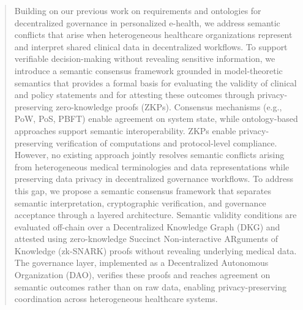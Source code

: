 \documentclass[journal]{IEEEtran}
\begin{document}







\maketitle

\begin{abstract}
Building on our previous work on requirements and ontologies for decentralized governance in personalized e-health, we address semantic conflicts that arise when heterogeneous healthcare organizations represent and interpret shared clinical data in decentralized workflows. To support verifiable decision-making without revealing sensitive information, we introduce a semantic consensus framework grounded in model-theoretic semantics that provides a formal basis for evaluating the validity of clinical and policy statements and for attesting these outcomes through privacy-preserving zero-knowledge proofs (ZKPs).
Consensus mechanisms (e.g., PoW, PoS, PBFT) enable agreement on system state, while ontology-based approaches support semantic interoperability. ZKPs enable privacy-preserving verification of computations and protocol-level compliance.
However, no existing approach jointly resolves semantic conflicts 
arising from heterogeneous medical terminologies and data representations while preserving data privacy in decentralized 
governance workflows.
To address this gap, we propose a semantic consensus framework that separates semantic interpretation, cryptographic verification, and governance acceptance through a layered architecture. Semantic validity conditions are evaluated off-chain over a Decentralized Knowledge Graph (DKG) and attested using zero-knowledge Succinct Non-interactive ARguments of Knowledge (zk-SNARK) proofs without revealing underlying medical data.
The governance layer, implemented as a Decentralized Autonomous Organization (DAO), verifies these proofs and reaches agreement on semantic outcomes rather than on raw data, enabling privacy-preserving coordination across heterogeneous healthcare systems.
\end{abstract}
\end{document}
